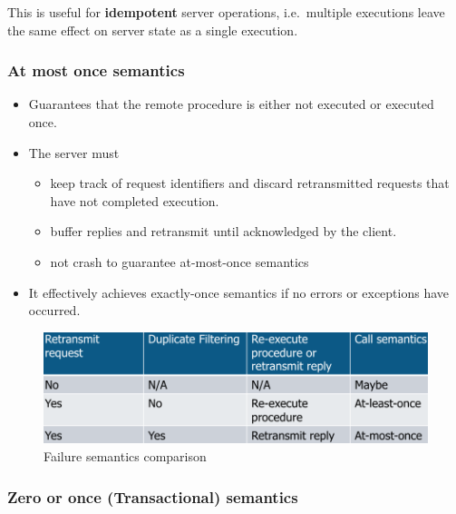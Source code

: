 \documentclass[twocolumn,landscape,10pt]{article}
\theoremstyle{definition}
\begin{document}
\noindent This is useful for \textbf{idempotent} server operations, i.e.\ multiple
executions leave the same effect on server state as a single execution.


\subsubsection{At most once semantics}

\begin{itemize}
    \item Guarantees that the remote procedure is either not executed or
        executed once.
    \item The server must 
        \begin{itemize}
            \item keep track of request identifiers and discard 
                retransmitted requests that have not completed execution.
            \item buffer replies and retransmit until acknowledged by the client.
            \item not crash to guarantee at-most-once semantics
        \end{itemize} 
    \item It effectively achieves exactly-once semantics if no errors or
        exceptions have occurred.
\end{itemize} 

\begin{figure}[h]
  	\includegraphics[scale=0.35]{semantics.png}
  	\centering
  	\caption{Failure semantics comparison}
\end{figure}

\subsubsection{Zero or once (Transactional) semantics}
\end{document}
